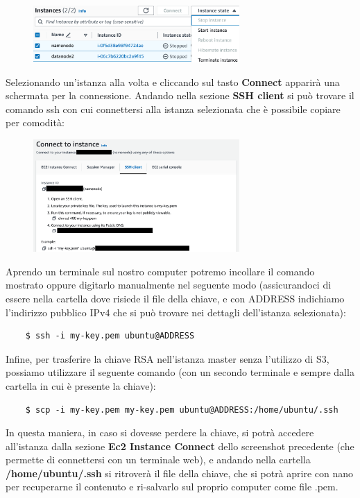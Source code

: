 \begin{figure}[H]
    \centering
    \includegraphics[width=0.7\textwidth]{images/activate-instance.png}
\end{figure}

Selezionando un'istanza alla volta e cliccando sul tasto \textbf{Connect} apparirà una schermata per la connessione. Andando nella sezione \textbf{SSH client} si può trovare il comando ssh con cui connettersi alla istanza selezionata che è possibile copiare per comodità:

\begin{figure}[H]
    \centering
    \includegraphics[width=0.7\textwidth]{images/instance-connect.png}
\end{figure}

Aprendo un terminale sul nostro computer potremo incollare il comando mostrato oppure digitarlo manualmente nel seguente modo (assicurandoci di essere nella cartella dove risiede il file della chiave, e con ADDRESS indichiamo l'indirizzo pubblico IPv4 che si può trovare nei dettagli dell'istanza selezionata):

\begin{verbatim}
    $ ssh -i my-key.pem ubuntu@ADDRESS
\end{verbatim}

Infine, per trasferire la chiave RSA nell'istanza master senza l'utilizzo di S3, possiamo utilizzare il seguente comando (con un secondo terminale e sempre dalla cartella in cui è presente la chiave):

\begin{verbatim}
    $ scp -i my-key.pem my-key.pem ubuntu@ADDRESS:/home/ubuntu/.ssh
\end{verbatim}

In questa maniera, in caso si dovesse perdere la chiave, si potrà accedere all'istanza dalla sezione \textbf{Ec2 Instance Connect} dello screenshot precedente (che permette di connettersi con un terminale web), e andando nella cartella \textbf{/home/ubuntu/.ssh} si ritroverà il file della chiave, che si potrà aprire con nano per recuperarne il contenuto e ri-salvarlo sul proprio computer come file .pem.
